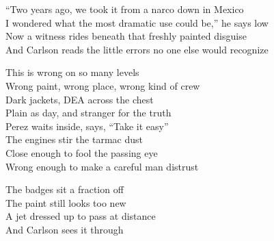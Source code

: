\begin{lyrics}
“Two years ago, we took it from a narco down in Mexico\\
I wondered what the most dramatic use could be,” he says low\\
Now a witness rides beneath that freshly painted disguise\\
And Carlson reads the little errors no one else would recognize

This is wrong on so many levels\\
Wrong paint, wrong place, wrong kind of crew\\
Dark jackets, DEA across the chest\\
Plain as day, and stranger for the truth\\
Perez waits inside, says, “Take it easy”\\
The engines stir the tarmac dust\\
Close enough to fool the passing eye\\
Wrong enough to make a careful man distrust

The badges sit a fraction off\\
The paint still looks too new\\
A jet dressed up to pass at distance\\
And Carlson sees it through
\end{lyrics}

